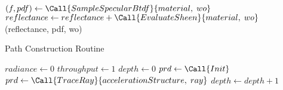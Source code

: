 \begin{algorithm}
    \begin{algorithmic}[1] %
                \State $(f, pdf) \gets \Call{SampleSpecularBtdf}{material,\;wo}$
            \EndIf
            \State
            \State $reflectance \gets reflectance + \Call{EvaluateSheen}{material,\;wo}$
            \State
            \Return (reflectance, pdf, wo)
        \EndProcedure
    \end{algorithmic}
\end{algorithm}

\begin{algorithm}
    \caption{Path Construction Routine}
    \label{alg:path-construction}
    \begin{algorithmic}[1] %
            \State $radiance \gets 0$ 
            \State $throughput \gets 1$
            \State $depth \gets 0$
            \State
            \State $prd \gets \Call{Init}$
            \State
                \State
                \State $prd \gets \Call{TraceRay}{accelerationStructure,\;ray}$
                \State $depth \gets depth + 1$
                \State
                \EndIf
                \State
    \end{algorithmic}
\end{algorithm}

